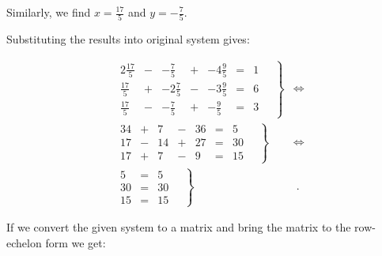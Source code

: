 \documentclass[11pt]{article}
\begin{document}
Similarly, we find \(x = \frac{17}{5}\) and \(y = -\frac{7}{5}\).

Substituting the results into original system gives:

\begin{align*}
  \left.
    \begin{alignedat}{4}
      & 2\frac{17}{5} & {}-{} & -\frac{7}{5}  & {}+{} & -4\frac{9}{5} & {}={} & 1 \\
      &  \frac{17}{5} & {}+{} & -2\frac{7}{5} & {}-{} & -3\frac{9}{5} & {}={} & 6 \\
      &  \frac{17}{5} & {}-{} & -\frac{7}{5}  & {}+{} & -\frac{9}{5}  & {}={} & 3
    \end{alignedat}
    \quad \right\} &
  \iff \\
  \left.
  \begin{alignedat}{4}
    & 34 & {}+{} & 7  & {}-{} & 36 & {}={} & 5 \\
    & 17 & {}-{} & 14 & {}+{} & 27 & {}={} & 30 \\
    & 17 & {}+{} & 7  & {}-{} &  9 & {}={} & 15
  \end{alignedat}
  \quad \right\} & 
  \iff \\
  \left.
  \begin{alignedat}{4}
    & 5 & {}={} & 5 \\
    & 30 & {}={} & 30 \\
    & 15 & {}={} & 15
  \end{alignedat}
  \quad \right\} & \;.
\end{align*}

If we convert the given system to a matrix and bring the matrix to the
row-echelon form we get:
\end{document}
